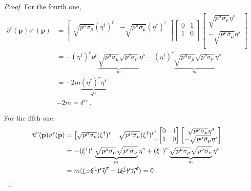 \begin{proof}
        For the fourth one, 
        \begin{equation*}
        \begin{aligned}
            \overline v^r (\mathbf p) v^s (\mathbf p) & = \begin{bmatrix}
                \sqrt{p^\mu \sigma_\mu} (\eta^\dagger)^r & - \sqrt{p^\mu \overline \sigma_\mu} (\eta^\dagger)^r \\
            \end{bmatrix} \begin{bmatrix}
                0 & 1 \\ 1 & 0 \\
            \end{bmatrix} \begin{bmatrix}
                \sqrt{p^\mu \sigma_\mu} \eta^s \\ - \sqrt{p^\mu \overline \sigma_\mu} \eta^s \\
            \end{bmatrix} \\ & = - (\eta^\dagger)^r p^\mu \underbrace{\sqrt{p^\mu  \sigma_\mu} \sqrt{p^\nu \overline \sigma_\nu}}_m \eta^s - (\eta^\dagger)^r \underbrace{\sqrt{p^\mu \sigma_\mu} \sqrt{p^\nu \overline \sigma_\nu}}_m \eta^s \\ & = - 2 m \underbrace{(\eta^\dagger)^r \eta^s}_{\delta^{rs}} \\ & - 2 m = \delta^{rs} ~.
        \end{aligned}
        \end{equation*}

        For the fifth one, 
        \begin{equation*}
        \begin{aligned}
            \overline u^r (\mathbf p) v^s (\mathbf p) & = \begin{bmatrix}
                \sqrt{p^\mu \sigma_\mu} (\xi^\dagger)^r & \sqrt{p^\mu \overline \sigma_\mu} (\xi^\dagger)^r \\
            \end{bmatrix} \begin{bmatrix}
                0 & 1 \\ 1 & 0 \\
            \end{bmatrix} \begin{bmatrix}
                \sqrt{p^\mu \sigma_\mu} \eta^s \\ - \sqrt{p^\mu \overline \sigma_\mu} \eta^s \\
            \end{bmatrix} \\ & = - (\xi^\dagger)^r \underbrace{\sqrt{p^\mu  \sigma_\mu} \sqrt{p^\nu \overline \sigma_\nu}}_m \eta^s + (\xi^\dagger)^r \underbrace{\sqrt{p^\mu \sigma_\mu} \sqrt{p^\nu \overline \sigma_\nu}}_m \eta^s \\ & = m ( \cancel{(- \xi^\dagger)^r \eta^s} + \cancel{(\xi^\dagger)^r \eta^2}) = 0 ~.
        \end{aligned}
        \end{equation*}


\end{proof}
